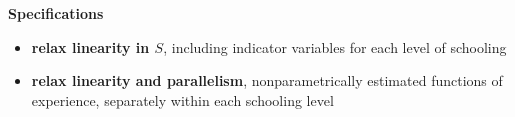 \begin{frame}\textbf{Specifications}\vspace{0.3cm}
\begin{itemize}\setlength\itemsep{1em}
\item \textbf{relax linearity in $S$}, including indicator variables for each level of schooling
\item \textbf{relax linearity and parallelism}, nonparametrically estimated functions of experience, separately within each schooling level
\end{itemize}
\end{frame}
\begin{frame}[plain]
\begin{center}
\end{center}
\end{frame}
\begin{frame}[plain]
\begin{center}
\end{center}
\end{frame}
\begin{frame}[plain]
\begin{center}
\end{center}
\end{frame}
\begin{frame}[plain]
\begin{center}
\end{center}
\end{frame}
